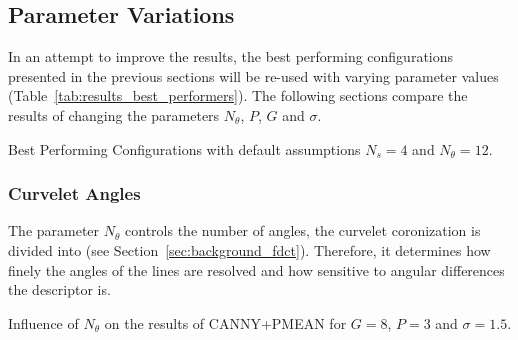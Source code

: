 \subsection{Parameter Variations}

In an attempt to improve the results, the best performing configurations
presented in the previous sections will be re-used with varying parameter
values (Table~\ref{tab:results_best_performers}). The following sections
compare the results of changing the parameters $N_{\theta}$, $P$, $G$ and
$\sigma$.

\begin{table}[h]
    \centering
    \resultsbestperformers
    \caption[Best Performing Configurations]{
        Best Performing Configurations with default assumptions $N_s=4$ and
        $N_{\theta}=12$.
    }
    \label{tab:results_best_performers}
\end{table}

\FloatBarrier
\subsubsection{Curvelet Angles}

The parameter $N_{\theta}$ controls the number of angles, the curvelet
coronization is divided into (see Section~\ref{sec:background_fdct}).
Therefore, it determines how finely the angles of the lines are resolved and
how sensitive to angular differences the descriptor is.

\begin{table}[h]
    \centering
    \resultsparameterangles
    \caption[Angle Parameter Results]{
        Influence of $N_{\theta}$ on the results of CANNY+PMEAN for $G=8$,
        $P=3$ and $\sigma=1.5$.
    }
    \label{tab:results_best_performers}
\end{table}

\FloatBarrier



